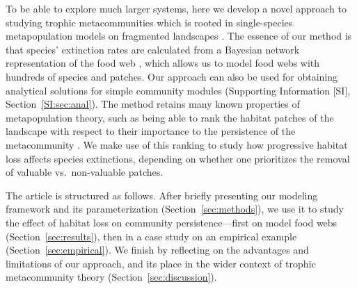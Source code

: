 \documentclass[11pt]{article}
\newcommand{\SI}{SI}
\begin{document}
To be able to explore much larger systems, here we develop a novel approach to studying trophic metacommunities which is rooted in single-species metapopulation models on fragmented landscapes \citep{HanskiOvaskainen2000, OvaskainenHanski2001, HanskiOvaskainen2003, Grillietal2015}. The essence of our method is that species' extinction rates are calculated from a Bayesian network representation of the food web \citep{Eklofetal2013MEE}, which allows us to model food webs with hundreds of species and patches. Our approach can also be used for obtaining analytical solutions for simple community modules (Supporting Information [\SI], Section~\ref{SI:sec:anal}). The method retains many known properties of metapopulation theory, such as being able to rank the habitat patches of the landscape with respect to their importance to the persistence of the metacommunity \citep{OvaskainenHanski2001}. We make use of this ranking to study how progressive habitat loss affects species extinctions, depending on whether one prioritizes the removal of valuable vs.\ non-valuable patches.

The article is structured as follows. After briefly presenting our modeling framework and its parameterization (Section~\ref{sec:methods}), we use it to study the effect of habitat loss on community persistence---first on model food webs (Section~\ref{sec:results}), then in a case study on an empirical example (Section~\ref{sec:empirical}). We finish by reflecting on the advantages and limitations of our approach, and its place in the wider context of trophic metacommunity theory (Section~\ref{sec:discussion}).
\end{document}
